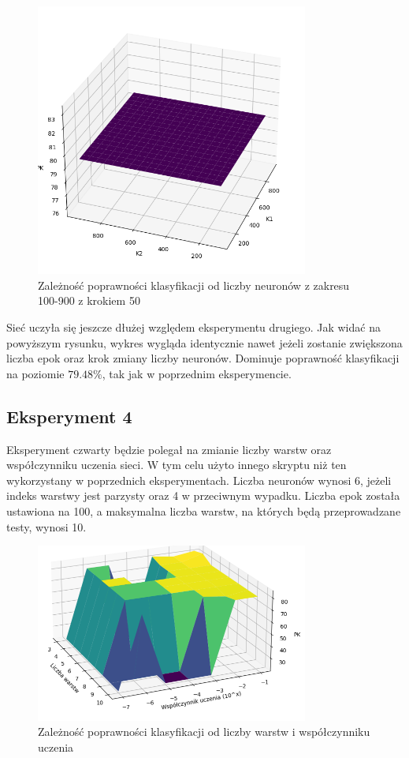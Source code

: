 \documentclass[a4paper]{article}
\begin{document}
\begin{figure}[H]
    \centering
    \includegraphics[width=0.8\textwidth, keepaspectratio]{pictures/k1_k2_dobre_3_950_50.png}
    \caption{Zależność poprawności klasyfikacji od liczby neuronów z zakresu 100-900 z krokiem 50}
    \label{fig:k1k2_3}
\end{figure}

Sieć uczyła się jeszcze dłużej względem eksperymentu drugiego.
Jak widać na powyższym rysunku, wykres wygląda identycznie nawet jeżeli zostanie zwiększona liczba epok oraz krok zmiany liczby neuronów.
Dominuje poprawność klasyfikacji na poziomie $79.48\%$, tak jak w poprzednim eksperymencie.

\newpage
\subsection{Eksperyment 4}
Eksperyment czwarty będzie polegał na zmianie liczby warstw oraz współczynniku uczenia sieci.
W tym celu użyto innego skryptu niż ten wykorzystany w poprzednich eksperymentach.
Liczba neuronów wynosi 6, jeżeli indeks warstwy jest parzysty oraz 4 w przeciwnym wypadku.
Liczba epok została ustawiona na 100, a maksymalna liczba warstw, na których będą przeprowadzane testy, wynosi 10.

\begin{figure}[H]
    \centering
    \includegraphics[width=0.8\textwidth, keepaspectratio]{pictures/LR_LAYERS_100ECHO.PNG}
    \caption{Zależność poprawności klasyfikacji od liczby warstw i współczynniku uczenia}
    \label{fig:lr_layers_1}
\end{figure}
\end{document}

